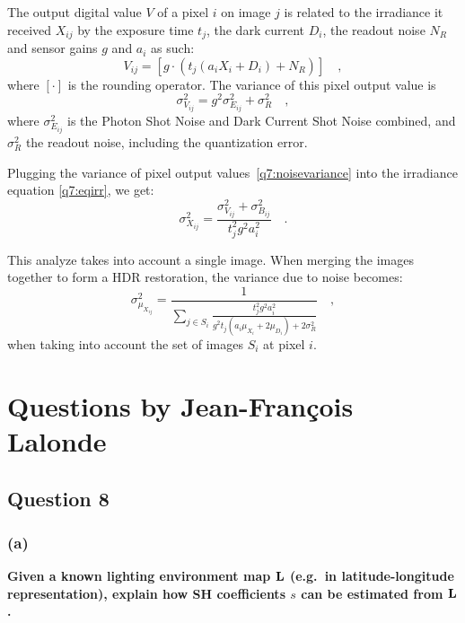 \documentclass{report}
\begin{document}
The output digital value $V$ of a pixel $i$ on image $j$ is related to the irradiance it received $X_{ij}$ by the exposure time $t_j$, the dark current $D_i$, the readout noise $N_R$ and sensor gains $g$ and $a_i$ as such:
\begin{equation}
V_{ij} = \left[ g \cdot \left( t_j \left( a_i X_i + D_i \right ) + N_R\right) \right] \quad,
\end{equation}
where $\left[ \cdot \right]$ is the rounding operator. The variance of this pixel output value is
\begin{equation}
\label{q7:noisevariance}
\sigma_{V_{ij}}^2 = g^2 \sigma_{E_{ij}}^2 + \sigma_R^2
\quad,
\end{equation}
where $\sigma_{E_{ij}}^2$ is the Photon Shot Noise and Dark Current Shot Noise combined, and $\sigma_R^2$ the readout noise, including the quantization error.

Plugging the variance of pixel output values~\eqref{q7:noisevariance} into the irradiance equation \eqref{q7:eqirr}, we get:
\begin{equation}
\sigma_{X_{ij}}^2 = \frac{\sigma_{V_{ij}}^2 + \sigma_{B_{ij}}^2}{t_j^2 g^2 a_i^2} \quad.
\end{equation}

This analyze takes into account a single image. When merging the images together to form a HDR restoration, the variance due to noise becomes:
\begin{equation}
\sigma_{\mu_{X_{ij}}}^2 = \frac{1}{\sum_{j \in S_i} \frac{t_j^2 g^2 a_i^2}{g^2 t_j \left( a_i \mu_{X_i} + 2 \mu_{D_i} \right) + 2 \sigma_R^2}} \quad,
\end{equation}
when taking into account the set of images $S_i$ at pixel $i$.

\chapter{Questions by Jean-François Lalonde}

\section{Question 8}
\subsection{(a)}
\textbf{Given a known lighting environment map $\mathbf{L}$ (e.g.\ in latitude-longitude representation), explain how SH coefficients $s$ can be estimated from $\mathbf{L}$.}
\end{document}
